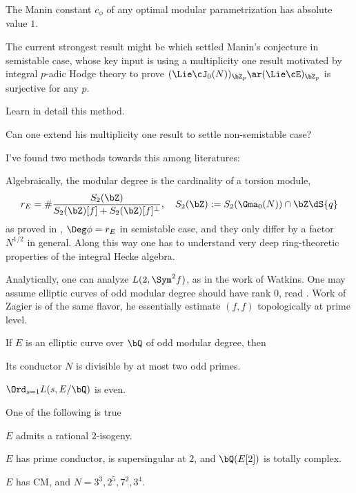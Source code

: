 \documentclass[a4paper, twoside]{article}
\begin{document}
\begin{cnj}
	The Manin constant $c_{\phi}$ of any optimal modular parametrization has absolute value $1$.
\end{cnj}
\begin{rmk}
	The current strongest result might be \cite[Theorem~2.13]{Cesnavicius2018} which settled Manin's conjecture in semistable case, whose key input is using a multiplicity one result \cite[Proposition~2.2]{Cesnavicius2018} motivated by integral $p$-adic Hodge theory to prove $(\Lie\cJ_{0}(N))_{\bZ_{p}}\ar(\Lie\cE)_{\bZ_{p}}$ is surjective for any $p$.
	\begin{itm}
		\item[\TODO] Learn in detail this method.
		\item[\TODO] Can one extend his multiplicity one result to settle non-semistable case?
	\end{itm}
\end{rmk}


I've found two methods towards this among literatures:
\begin{itm}
	\item Algebraically, the modular degree is the cardinality of a torsion module,
	\[
		r_{E}=\#\frac{S_{2}(\bZ)}{S_{2}(\bZ)[f]+S_{2}(\bZ)[f]^{\perp}},\quad S_{2}(\bZ):=S_{2}(\Gma_{0}(N))\cap \bZ\dS{q}
	\]
	as proved in \cite{ARS2012}, $\Deg\phi=r_{E}$ in semistable case, and they only differ by a factor $N^{1/2}$ in general. Along this way one has to understand very deep ring-theoretic properties of the integral Hecke algebra.
	\item Analytically, one can analyze $L(2,\Sym^{2}f)$, as in the work of Watkins\cite{Watkins2002}. One may assume elliptic curves of odd modular degree should have rank $0$, read \cite{CE2009Odd}. Work of Zagier\cite{Zagier1985Parametrization} is of the same flavor, he essentially estimate $(f,f)$ topologically at prime level.
\end{itm}


\begin{thm}
	If $E$ is an elliptic curve over $\bQ$ of odd modular degree, then
	\begin{enr}
		\item Its conductor $N$ is divisible by at most two odd primes.
		\item $\Ord_{s=1}L(s,E/\bQ)$ is even.
		\item One of the following is true
		\begin{enr}
			\item $E$ admits a rational $2$-isogeny.
			\item $E$ has prime conductor, is supersingular at $2$, and $\bQ(E[2])$ is totally complex.
			\item $E$ has CM, and $N=3^{3},2^{5},7^{2},3^{4}$.
		\end{enr}
	\end{enr}
\end{thm}

\printref
\end{document}
